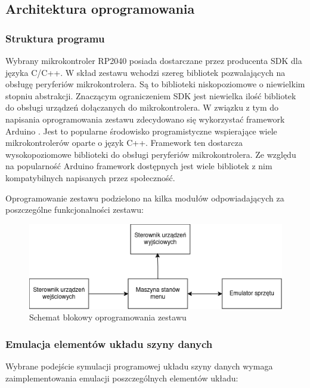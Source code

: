 \documentclass[../main.tex]{subfiles}
\begin{document}
\subsection{Architektura oprogramowania}

    \subsubsection{Struktura programu}

    Wybrany mikrokontroler RP2040 posiada dostarczane przez producenta SDK dla języka C/C++. W skład zestawu wchodzi szereg
    bibliotek pozwalających na obsługę peryferiów mikrokontrolera. Są to biblioteki niskopoziomowe o niewielkim stopniu abstrakcji.
    Znaczącym ograniczeniem SDK jest niewielka ilość bibliotek do obsługi urządzeń dołączanych do mikrokontrolera.
    W związku z tym do napisania oprogramowania zestawu zdecydowano się wykorzystać framework Arduino \cite{arduino_pico}. Jest to popularne środowisko 
    programistyczne wspierające wiele mikrokontrolerów oparte o język C++. Framework ten dostarcza wysokopoziomowe biblioteki do obsługi
    peryferiów mikrokontrolera. Ze względu na popularność Arduino framework dostępnych jest wiele bibliotek z nim kompatybilnych napisanych
    przez społeczność. 
    \par
    Oprogramowanie zestawu podzielono na kilka modułów odpowiadających za poszczególne funkcjonalności zestawu:

    \begin{figure}[H]
        \centering
        \includegraphics[scale=0.6]{software_diagram.png}
        \caption{Schemat blokowy oprogramowania zestawu}
        \label{fig:software_diagram}
    \end{figure}

    \subsubsection{Emulacja elementów układu szyny danych}

    Wybrane podejście symulacji programowej układu szyny danych wymaga zaimplementowania emulacji poszczególnych elementów układu:
\end{document}
